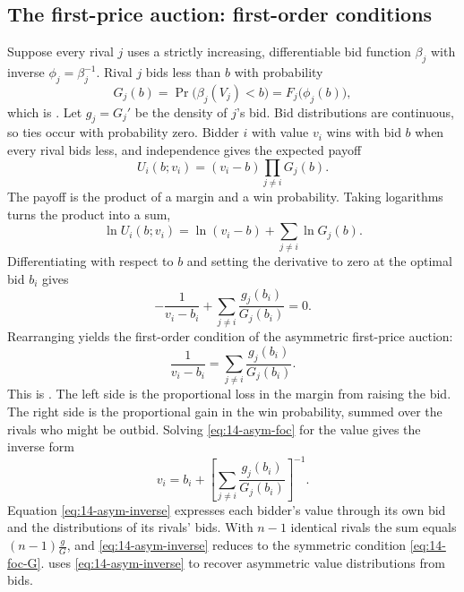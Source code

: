 \subsection{The first-price auction: first-order conditions}\label{sec:14-asym-foc}

Suppose every rival $j$ uses a strictly increasing, differentiable bid function $\beta_j$ with inverse
$\phi_j=\beta_j^{-1}$. Rival $j$ bids less than $b$ with probability
\begin{equation}\label{eq:14-asym-G}
G_j(b)=\Pr\bigl(\beta_j(V_j)<b\bigr)=F_j\bigl(\phi_j(b)\bigr),
\end{equation}
which is \citet[eq. (1)]{AtheyLevinSeira2011}. Let $g_j=G_j'$ be the density of $j$'s bid. Bid
distributions are continuous, so ties occur with probability zero. Bidder $i$ with value $v_i$ wins
with bid $b$ when every rival bids less, and independence gives the expected payoff
\begin{equation}\label{eq:14-asym-payoff}
U_i(b;v_i)=(v_i-b)\prod_{j\neq i}G_j(b).
\end{equation}
The payoff is the product of a margin and a win probability. Taking logarithms turns the product into
a sum,
\[
\ln U_i(b;v_i)=\ln(v_i-b)+\sum_{j\neq i}\ln G_j(b).
\]
Differentiating with respect to $b$ and setting the derivative to zero at the optimal bid $b_i$ gives
\[
-\frac{1}{v_i-b_i}+\sum_{j\neq i}\frac{g_j(b_i)}{G_j(b_i)}=0 .
\]
Rearranging yields the first-order condition of the asymmetric first-price auction:
\begin{equation}\label{eq:14-asym-foc}
\frac{1}{v_i-b_i}=\sum_{j\neq i}\frac{g_j(b_i)}{G_j(b_i)} .
\end{equation}
This is \citet[eq. (2)]{AtheyLevinSeira2011}. The left side is the proportional loss in the margin
from raising the bid. The right side is the proportional gain in the win probability, summed over the
rivals who might be outbid. Solving \eqref{eq:14-asym-foc} for the value gives the inverse form
\begin{equation}\label{eq:14-asym-inverse}
v_i=b_i+\left[\sum_{j\neq i}\frac{g_j(b_i)}{G_j(b_i)}\right]^{-1}.
\end{equation}
Equation \eqref{eq:14-asym-inverse} expresses each bidder's value through its own bid and the
distributions of its rivals' bids. With $n-1$ identical rivals the sum equals $(n-1)\frac{g}{G}$, and
\eqref{eq:14-asym-inverse} reduces to the symmetric condition \eqref{eq:14-foc-G}.  uses \eqref{eq:14-asym-inverse} to recover asymmetric value distributions
from bids.

